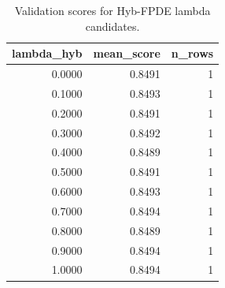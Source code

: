 \begin{table}[t]
\caption{Validation scores for Hyb-FPDE lambda candidates.}
\label{tab:lambda_distribution_computed}
\centering
\begin{tabular}{rrr}
\toprule
lambda\_hyb & mean\_score & n\_rows \\
\midrule
0.0000 & 0.8491 & 1 \\
0.1000 & 0.8493 & 1 \\
0.2000 & 0.8491 & 1 \\
0.3000 & 0.8492 & 1 \\
0.4000 & 0.8489 & 1 \\
0.5000 & 0.8491 & 1 \\
0.6000 & 0.8493 & 1 \\
0.7000 & 0.8494 & 1 \\
0.8000 & 0.8489 & 1 \\
0.9000 & 0.8494 & 1 \\
1.0000 & 0.8494 & 1 \\
\bottomrule
\end{tabular}

\end{table}

